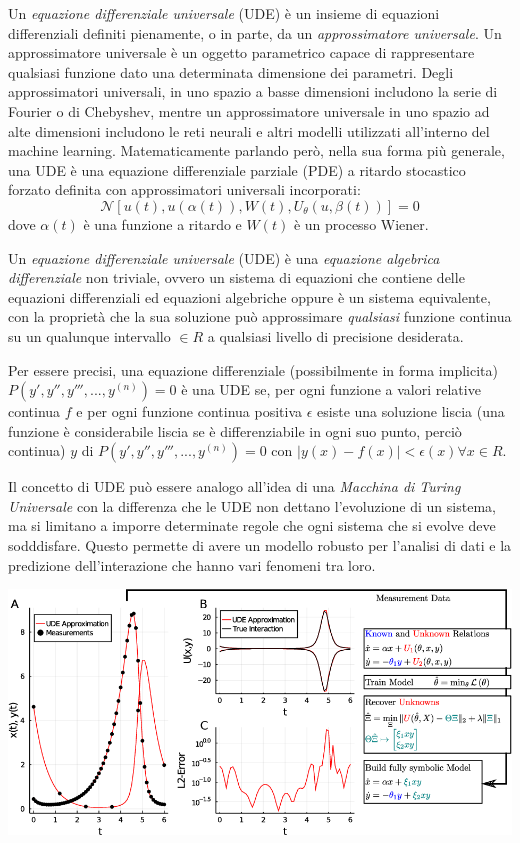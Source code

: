 Un \emph{equazione differenziale universale} (UDE) è un insieme di equazioni differenziali definiti pienamente,
o in parte, da un \emph{approssimatore universale}. Un approssimatore universale è un oggetto parametrico 
capace di rappresentare qualsiasi funzione dato una determinata dimensione dei parametri. Degli approssimatori 
universali, in uno spazio a basse dimensioni includono la serie di Fourier o di Chebyshev, mentre un 
approssimatore universale in uno spazio ad alte dimensioni includono le reti neurali e altri modelli utilizzati 
all'interno del machine learning. Matematicamente parlando però, nella sua forma più generale, una UDE è 
una equazione differenziale parziale (PDE) a ritardo stocastico forzato definita con approssimatori universali incorporati:
$$\mathcal{N}[u(t), u(\alpha(t)), W(t), U_\theta(u, \beta(t))] = 0$$
dove $\alpha(t)$ è una funzione a ritardo e $W(t)$ è un processo Wiener.

Un \emph{equazione differenziale universale} (UDE) è una \emph{equazione algebrica
differenziale} 
non triviale, ovvero un sistema di equazioni che contiene delle equazioni differenziali
ed equazioni algebriche oppure è un sistema equivalente,
con la proprietà che la sua soluzione può approssimare
\emph{qualsiasi} funzione continua su un qualunque intervallo $\in R$ a 
qualsiasi livello di precisione desiderata. 

Per essere precisi, una equazione differenziale (possibilmente in forma implicita)
$P( y', y'', y''', ..., y^{(n)})=0$ è una UDE se, per ogni funzione a valori relative
continua $f$ e per ogni funzione continua positiva $\epsilon$ esiste una 
soluzione liscia (una funzione è considerabile liscia se è 
differenziabile in ogni suo punto, perciò continua) $y$ di $P( y', y'', y''', ..., y^{(n)})=0$
con $|y(x) - f(x)| < \epsilon(x) \forall x \in R$.

Il concetto di UDE può essere analogo all'idea di una \emph{Macchina di Turing Universale}
con la differenza che le UDE non dettano 
l'evoluzione di un sistema, ma si limitano a imporre determinate regole che 
ogni sistema che si evolve deve sodddisfare. Questo permette di avere un modello robusto 
per l'analisi di dati e la predizione dell'interazione che hanno vari fenomeni tra loro.

\begin{minipage}{\linewidth}
    \centering
    \includegraphics[width=\textwidth]{img/ude_approx.png}
    \label{fig:UDE_approx}
\end{minipage}

